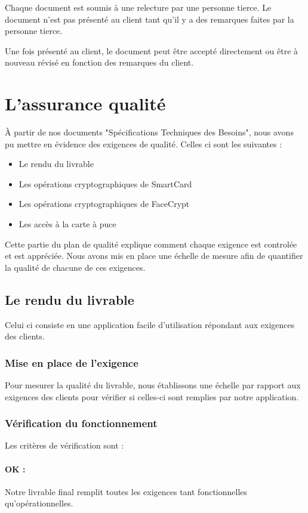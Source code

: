 \documentclass[a4paper,11pt,french]{article}
\begin{document}
	Chaque document est soumis à une relecture par une personne tierce.
Le document n'est pas présenté au client tant qu'il y a des remarques faites
par la personne tierce.

	Une fois présenté au client, le document peut être accepté directement
ou \^etre à nouveau révisé en fonction des remarques du client.


\section{L'assurance qualité}

	À partir de nos documents "Spécifications Techniques des Besoins", nous
avons pu mettre en évidence des exigences de qualité. Celles ci sont les
suivantes :
\begin{itemize}
	\item Le rendu du livrable
	\item Les opérations cryptographiques de SmartCard
	\item Les opérations cryptographiques de FaceCrypt
	\item Les accès à la carte à puce
\end{itemize}

	Cette partie du plan de qualité explique comment chaque exigence est
controlée et est appréciée. Nous avons mis en place une échelle de mesure afin
de quantifier la qualité de chacune de ces exigences.

\newpage
\subsection{Le rendu du livrable}
	Celui ci consiste en une application facile d'utilisation répondant
aux exigences des clients.
\subsubsection{Mise en place de l'exigence}
	Pour mesurer la qualité du livrable, nous établissons une échelle
par rapport aux exigences des clients pour v\'erifier si celles-ci sont remplies par notre
application.
\subsubsection{Vérification du fonctionnement}
	Les critères de vérification sont :
\paragraph{OK : } Notre livrable final remplit toutes les exigences tant
fonctionnelles qu'opérationnelles.
\end{document}
